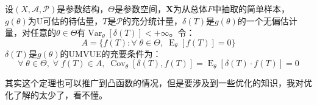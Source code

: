 \begin{corollary}\label{cor:UMVUE0UnbiasedEstimation}
		设$(X,\mathscr{A},\mathscr{P})$是参数结构，$\Theta$是参数空间，$\mathbf{X}$为从总体$F$中抽取的简单样本，$g(\theta)$为U可估的待估量，$T$是$\mathscr{P}$的充分统计量，$\delta(T)$是$g(\theta)$的一个无偏估计量，对任意的$\theta\in\Theta$有$\operatorname{Var}_{\theta}[\delta(T)]<+\infty$。令：
	\begin{equation*}
		A=\{f(T):\forall\;\theta\in\Theta,\;\operatorname{E}_{\theta}[f(T)]=0\}
	\end{equation*}
	$\delta(T)$是$g(\theta)$的UMVUE的充要条件为：
	\begin{equation*}
		\forall\;\theta\in\Theta,\;\forall\;f(T)\in A,\;\operatorname{Cov}_{\theta}[\delta(T),f(T)]=\operatorname{E}_{\theta}[\delta(T)\cdot f(T)]=0
	\end{equation*}
\end{corollary}
\begin{note}
	其实这个定理也可以推广到凸函数的情况，但是要涉及到一些优化的知识，我对优化了解的太少了，看不懂。
\end{note}

